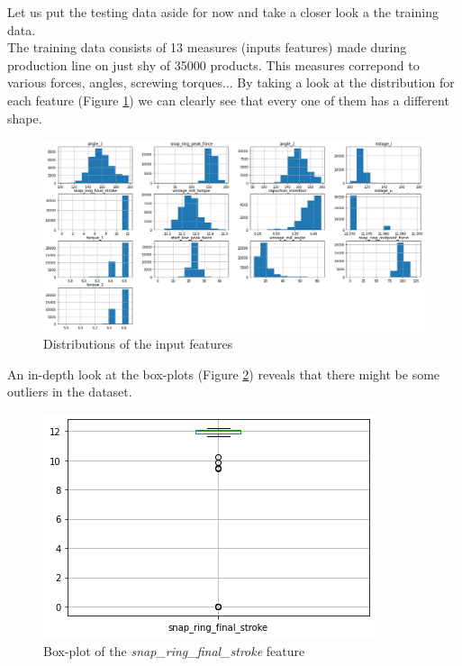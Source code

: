 Let us put the testing data aside for now and take a closer look a the training data.\\

The training data consists of 13 measures (inputs features) made during production line on just shy of 35000 products. This measures correpond to various forces, angles, screwing torques... By taking a look at the distribution for each feature (Figure \ref{data_analysis_1}) we can clearly see that every one of them has a different shape.\\

\begin{figure}
    \center
    \includegraphics[scale=.38]{img/data_analysis_1.png}
    \caption{Distributions of the input features}
    \label{data_analysis_1}
\end{figure}

An in-depth look at the box-plots (Figure \ref{data_analysis_2}) reveals that there might be some outliers in the dataset.\\

\begin{figure}
    \center
    \includegraphics[scale=.5]{img/data_analysis_2.png}
    \caption{Box-plot of the \textit{snap\_ring\_final\_stroke} feature}
    \label{data_analysis_2}
\end{figure}

